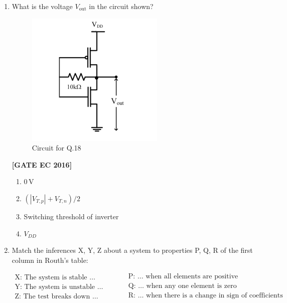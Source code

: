 \documentclass[12pt]{article}
\begin{document}
\begin{enumerate}[label=\textbf{Q.\arabic*.}, start=6, itemsep=2em]
\begin{enumerate}[label=\textbf{Q.\arabic*.}]
\item What is the voltage $V_{\text{out}}$ in the circuit shown?

\begin{figure}[H]\centering
    \includegraphics[width=0.6\columnwidth]{figs/q18.png}
    \caption{Circuit for Q.18}
    \label{fig:q18}
\end{figure}

\noindent \textbf{[GATE EC 2016]}

\begin{multicols}{2}
\begin{enumerate}[label=\alph*.]
    \item $0\,$V
    \item $(|V_{T,p}|+V_{T,n})/2$
    \item Switching threshold of inverter
    \item $V_{DD}$
\end{enumerate}
\end{multicols}

\item Match the inferences X, Y, Z about a system to properties P, Q, R of the first column in Routh's table:

\[
\begin{array}{ll}
\text{X: The system is stable …} & \\
\text{Y: The system is unstable …} & \\
\text{Z: The test breaks down …} &
\end{array}
\qquad
\begin{array}{ll}
\text{P: … when all elements are positive} & \\
\text{Q: … when any one element is zero} & \\
\text{R: … when there is a change in sign of coefficients} &
\end{array}
\]


\end{enumerate}
\end{enumerate}
\end{document}
